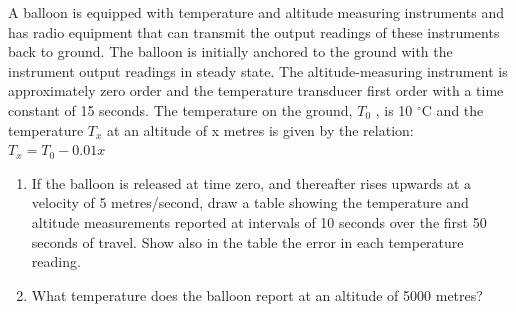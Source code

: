 \documentclass[a4paper,11pt,dvipsnames]{book}
\begin{document}
\begin{question}[subtitle=Example on $1_{\rm st}$-order device]
A balloon is equipped with temperature and altitude measuring instruments and has radio
equipment that can transmit the output readings of these instruments back to ground. The
balloon is initially anchored to the ground with the instrument output readings in steady state.
The altitude-measuring instrument is approximately zero order and the temperature transducer
first order with a time constant of 15 seconds. The temperature on the ground, $T_0$ , is 10 $^{\circ}$C and the temperature $T_x$  at an altitude of x metres is
given by the relation: \\
$T_x = T_0 - 0.01x$

\begin{enumerate}
\item If the balloon is released at time zero, and thereafter rises upwards at a velocity of 5 metres/second, draw a table showing the temperature and altitude measurements reported
at intervals of 10 seconds over the first 50 seconds of travel. Show also in the table the
error in each temperature reading.
\item  What temperature does the balloon report at an altitude of 5000 metres?
\end{enumerate}

\examspace*{10em}

\end{question}
\begin{solution}


\end{solution}
\end{document}

